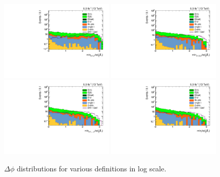 \begin{figure}[htbp]
  \centering
  \includegraphics[width=0.48\textwidth]{figures/semilept-incl-dphijetmet2log_l.pdf}
  \includegraphics[width=0.48\textwidth]{figures/semilept-incl-dphijetmet3log_l.pdf} \\
  \includegraphics[width=0.48\textwidth]{figures/semilept-incl-dphijetmet4log_l.pdf}
  \includegraphics[width=0.48\textwidth]{figures/semilept-incl-dphijetmetlog_l.pdf}
  \caption{$\Delta\phi$ distributions for various definitions in log scale.}
  \label{fig:semilept_dphijetmetlog}
\end{figure}

